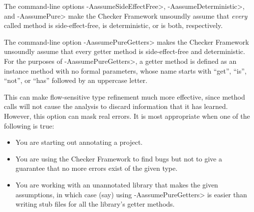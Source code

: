
The command-line options \<-AassumeSideEffectFree>,
\<-AassumeDeterministic>, and \<-AassumePure> make the Checker Framework
unsoundly assume that \emph{every} called method is side-effect-free, is
deterministic, or is both, respectively.

The command-line option \<-AassumePureGetters> makes the Checker Framework
unsoundly assume that every getter method is side-effect-free and
deterministic.  For the purposes of \<-AassumePureGetters>, a getter method
is defined as an instance method with no formal parameters, whose name
starts with ``get'', ``is'', ``not'', or ``has'' followed by an uppercase
letter.

This can make
flow-sensitive type refinement much more effective, since method calls will
not cause the analysis to discard information that it has learned.
However, this option can mask real errors.  It is most appropriate when one
of the following is true:
\begin{itemize}
\item
  You are starting out annotating a project.
\item
  You are using the Checker Framework to find bugs but not to give a
  guarantee that no more errors exist of the given type.
\item
  You are working with an unannotated library that makes the given
  assumptions, in which case (say) using \<-AassumePureGetters> is easier
  than writing stub files for all the library's getter methods.
\end{itemize}


